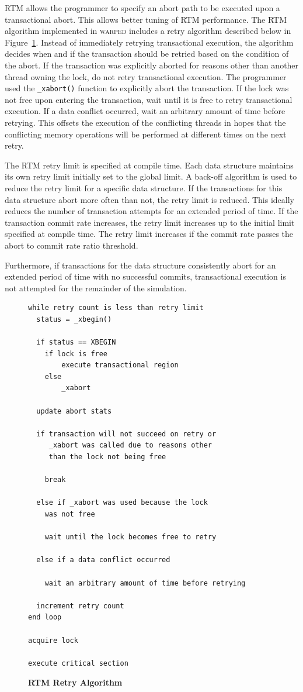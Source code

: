 \documentclass{sig-alternate}
\begin{document}
RTM allows the programmer to specify an abort path to be executed upon a transactional
abort.  This allows better tuning of RTM performance.  The RTM algorithm implemented in
\textsc{warped} includes a retry algorithm described below in Figure~\ref{rtm_retry}.
Instead of immediately retrying transactional execution, the algorithm decides when and if
the transaction should be retried based on the condition of the abort.  If the transaction
was explicitly aborted for reasons other than another thread owning the lock, do not retry
transactional execution.  The programmer used the \texttt{\_xabort()} function to
explicitly abort the transaction. If the lock was not free upon entering the transaction,
wait until it is free to retry transactional execution.  If a data conflict occurred, wait
an arbitrary amount of time before retrying.  This offsets the execution of the
conflicting threads in hopes that the conflicting memory operations will be performed at
different times on the next retry.

The RTM retry limit is specified at compile time.  Each data structure
maintains its own retry limit initially set to the global limit.  A back-off
algorithm is used to reduce the retry limit for a specific data structure.  If
the transactions for this data structure abort more often than not, the retry
limit is reduced.  This ideally reduces the number of transaction attempts for
an extended period of time.  If the transaction commit rate increases, the
retry limit increases up to the initial limit specified at compile time.  The
retry limit increases if the commit rate passes the abort to commit rate ratio
threshold.

Furthermore, if transactions for the data structure consistently abort for an extended
period of time with no successful commits, transactional execution is not attempted for
the remainder of the simulation.

\begin{figure}
\begin{verbatim}
while retry count is less than retry limit
  status = _xbegin()

  if status == XBEGIN
    if lock is free
        execute transactional region
    else
        _xabort

  update abort stats

  if transaction will not succeed on retry or 
     _xabort was called due to reasons other 
     than the lock not being free

    break

  else if _xabort was used because the lock 
    was not free

    wait until the lock becomes free to retry

  else if a data conflict occurred
        
    wait an arbitrary amount of time before retrying

  increment retry count
end loop

acquire lock

execute critical section
\end{verbatim}
\caption{\textbf{RTM Retry Algorithm}}\label{rtm_retry}
\end{figure}
\end{document}
